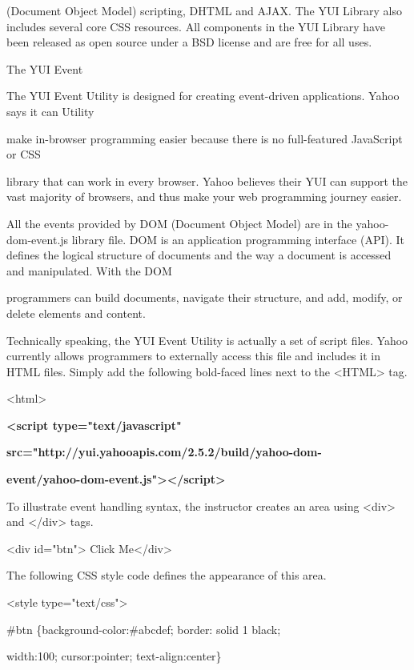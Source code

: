 \documentclass[
]{article}
\begin{document}
(Document Object Model) scripting, DHTML and AJAX. The YUI Library also
includes several core CSS resources. All components in the YUI Library
have been released as open source under a BSD license and are free for
all uses.

The YUI Event

The YUI Event Utility is designed for creating event-driven
applications. Yahoo says it can Utility

make in-browser programming easier because there is no full-featured
JavaScript or CSS

library that can work in every browser. Yahoo believes their YUI can
support the vast majority of browsers, and thus make your web
programming journey easier.

All the events provided by DOM (Document Object Model) are in the
yahoo-dom-event.js library file. DOM is an application programming
interface (API). It defines the logical structure of documents and the
way a document is accessed and manipulated. With the DOM

programmers can build documents, navigate their structure, and add,
modify, or delete elements and content.

Technically speaking, the YUI Event Utility is actually a set of script
files. Yahoo currently allows programmers to externally access this file
and includes it in HTML files. Simply add the following bold-faced lines
next to the \textless HTML\textgreater{} tag.

\textless html\textgreater{}

\textbf{\textless script type="text/javascript"}

\textbf{src="http://yui.yahooapis.com/2.5.2/build/yahoo-dom-}

\textbf{event/yahoo-dom-event.js"\textgreater\textless/script\textgreater{}}

To illustrate event handling syntax, the instructor creates an area
using \textless div\textgreater{} and \textless/div\textgreater{} tags.

\textless div id="btn"\textgreater{} Click Me\textless/div\textgreater{}

The following CSS style code defines the appearance of this area.

\textless style type="text/css"\textgreater{}

\#btn \{background-color:\#abcdef; border: solid 1 black;

width:100; cursor:pointer; text-align:center\}
\end{document}
